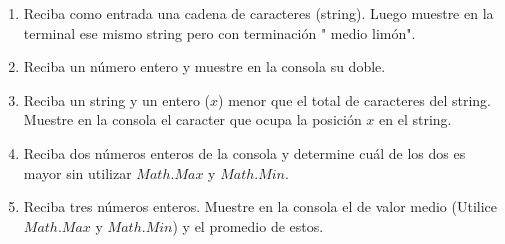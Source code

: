 \begin{enumerate}
	\item Reciba como entrada una cadena de caracteres (string).
        Luego muestre en la terminal ese mismo string pero con terminación " medio limón".
	\item Reciba un número entero y muestre en la consola su doble.
	\item Reciba un string y un entero ($x$) menor que el total de caracteres del string. Muestre en la consola el caracter que ocupa la posición $x$ en el string.
    \item Reciba dos números enteros de la consola y determine cuál de los dos es mayor sin utilizar $Math.Max$ y $Math.Min$.
	\item Reciba tres números enteros. Muestre en la consola el de valor medio (Utilice $Math.Max$ y $Math.Min$) y el promedio de estos.
\end{enumerate}